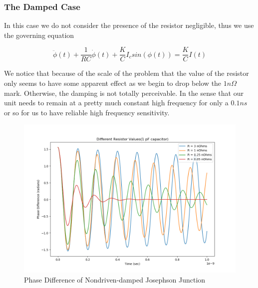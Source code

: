 \documentclass[12pt]{article}
\begin{document}
\subsubsection{The Damped Case}

In this case we do not consider the presence of the resistor negligible, thus we use the governing equation

\begin{equation}
\ddot{\phi}(t) + \dfrac{1}{RC} \dot{\phi}(t) + \dfrac{K}{C} I_c sin(\phi(t)) = \dfrac{K}{C} I(t)
\end{equation}

We notice that because of the scale of the problem that the value of the resistor only seems to have some apparent effect as we begin to drop below the $1 n\Omega$ mark.  Otherwise, the damping is not totally perceivable.  In the sense that our unit needs to remain at a pretty much constant high frequency for only a $0.1 ns$ or so for us to have reliable high frequency sensitivity.

\begin{figure}
\caption{Phase Difference of Nondriven-damped Josephson Junction}
\begin{center}
\includegraphics[scale=0.50]{dud-jjres.png}
\end{center}
\end{figure}
\end{document}
